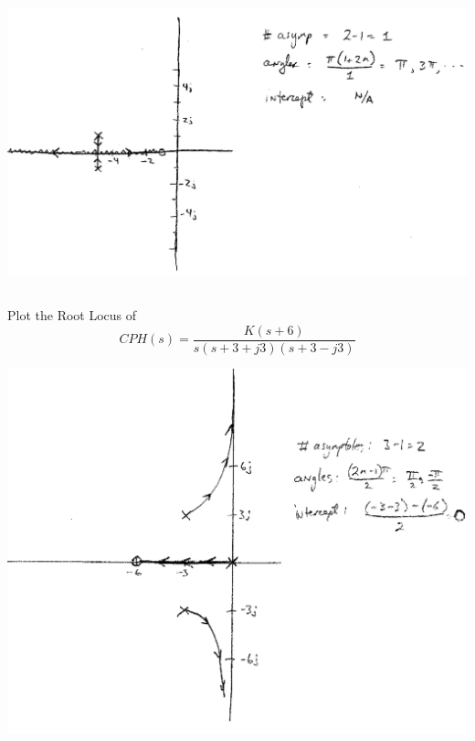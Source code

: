 \documentclass{article}	%
\begin{document}
\includegraphics[width=14cm]{00550a.png}	%


\subsection{}  Plot the Root Locus of
\[
CPH(s) = \frac{K(s+6)}{s(s+3+j3)(s+3-j3)}
\]

\includegraphics[width=14cm]{00558a.png}	%

\subsection{}
\end{document}
